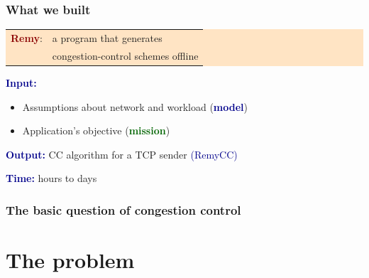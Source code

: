 \documentclass[svgnames]{beamer}
\newcommand{\ssline}{\vspace{8 pt}}
\begin{document}
\begin{frame}
\frametitle{What we built}

\colorbox{Bisque}{
\begin{centering}
\noindent \begin{tabular}{ll}
\Large \textcolor{DarkRed}{\bf Remy}: & \Large a program that generates \\ & \Large congestion-control schemes offline
\end{tabular}

\end{centering}}

\ssline
\ssline

\textcolor{DarkBlue}{\bf Input:}

\begin{itemize}
\item Assumptions about network and workload (\textbf{\textcolor{DarkBlue}{model}})

\item Application's objective (\textbf{\textcolor{DarkGreen}{mission}})
\end{itemize}

\textcolor{DarkBlue}{\bf Output:} CC algorithm for a TCP sender \hspace{0.177 cm}\textcolor{DarkBlue}{(RemyCC)}

\ssline

\textcolor{DarkBlue}{\bf Time:} hours to days

\vspace{\baselineskip}
\vspace{\baselineskip}
\vspace{\baselineskip}

\scriptsize


\end{frame}

\begin{frame}
\frametitle{The basic question of congestion control}

\section{The problem}

\begin{centering}

\end{centering}

\end{frame}
\end{document}
